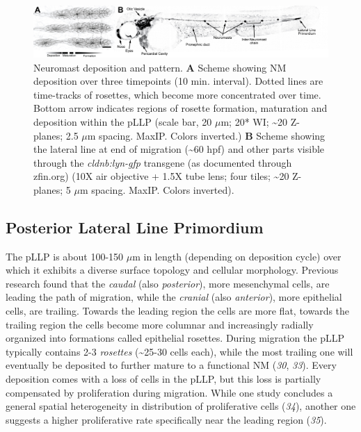 \documentclass[10pt, b5paper, singlespacinge, twoside]{reedthesis} %
\theoremstyle{definition}
\theoremstyle{definition}
\theoremstyle{definition}
\theoremstyle{remark}
\begin{document}
\begin{figure}

{\centering \includegraphics[width=0.95\linewidth]{figures/intro/ll_gfp} 

}

\caption[Neuromast deposition and pattern]{Neuromast deposition and pattern. \textbf{A} Scheme showing NM deposition over three timepoints (10 min. interval). Dotted lines are time-tracks of rosettes, which become more concentrated over time. Bottom arrow indicates regions of rosette formation, maturation and deposition within the pLLP (scale bar, 20 \(\mu\)m; 20* WI; \textasciitilde20 Z-planes; 2.5 \(\mu\)m spacing. MaxIP. Colors inverted.) \textbf{B} Scheme showing the lateral line at end of migration (\textasciitilde60 hpf) and other parts visible through the \emph{cldnb:lyn-gfp} transgene (as documented through zfin.org) (10X air objective + 1.5X tube lens; four tiles; \textasciitilde20 Z-planes; 5 \(\mu\)m spacing. MaxIP. Colors inverted).}\label{fig:llgfp}
\end{figure}
\hypertarget{posterior-lateral-line-primordium}{%
\subsection{Posterior Lateral Line Primordium}\label{posterior-lateral-line-primordium}}

The pLLP is about 100-150 \(\mu\)m in length (depending on deposition cycle) over which it exhibits a diverse surface topology and cellular morphology. Previous research found that the \emph{caudal} (also \emph{posterior}), more mesenchymal cells, are leading the path of migration, while the \emph{cranial} (also \emph{anterior}), more epithelial cells, are trailing. Towards the leading region the cells are more flat, towards the trailing region the cells become more columnar and increasingly radially organized into formations called epithelial rosettes. During migration the pLLP typically contains 2-3 \emph{rosettes} (\textasciitilde25-30 cells each), while the most trailing one will eventually be deposited to further mature to a functional NM (\emph{30}, \emph{33}). Every deposition comes with a loss of cells in the pLLP, but this loss is partially compensated by proliferation during migration. While one study concludes a general spatial heterogeneity in distribution of proliferative cells (\emph{34}), another one suggests a higher proliferative rate specifically near the leading region (\emph{35}).
\end{document}
